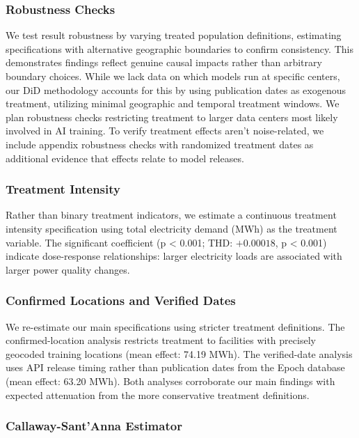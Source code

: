 \documentclass[a4paper,fleqn,longmktitle]{cas-sc}
\newcommand{\nb}[1]{\textcolor{blue}{NB[#1]}}
\theoremstyle{plain}
\theoremstyle{definition}
\begin{document}
\subsubsection{Robustness Checks}
We test result robustness by varying treated population definitions, estimating specifications with alternative geographic boundaries to confirm consistency. This demonstrates findings reflect genuine causal impacts rather than arbitrary boundary choices. While we lack data on which models run at specific centers, our DiD methodology accounts for this by using publication dates as exogenous treatment, utilizing minimal geographic and temporal treatment windows. We plan robustness checks restricting treatment to larger data centers most likely involved in AI training. To verify treatment effects aren't noise-related, we include appendix robustness checks with randomized treatment dates as additional evidence that effects relate to model releases.

\subsubsection{Treatment Intensity}

Rather than binary treatment indicators, we estimate a continuous treatment intensity specification using total electricity demand (MWh) as the treatment variable. The significant coefficient (p < 0.001; THD: $+0.00018$, p < 0.001) indicate dose-response relationships: larger electricity loads are associated with larger power quality changes.

\subsubsection{Confirmed Locations and Verified Dates}

We re-estimate our main specifications using stricter treatment definitions. The confirmed-location analysis restricts treatment to facilities with precisely geocoded training locations (mean effect: 74.19 MWh). The verified-date analysis uses API release timing rather than publication dates from the Epoch database (mean effect: 63.20 MWh). Both analyses corroborate our main findings with expected attenuation from the more conservative treatment definitions.

\subsubsection{Callaway-Sant'Anna Estimator}
\end{document}
